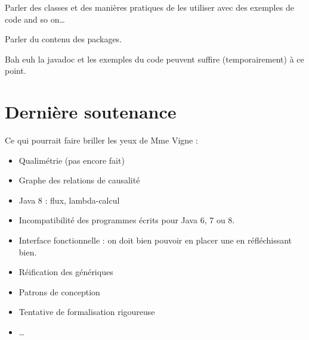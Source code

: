 \documentclass[11pt]{article}
\begin{document}
Parler des classes et des manières \og pratiques \fg{} de les utiliser avec des exemples de code and so on\dots

Parler du contenu des packages.

Bah euh la javadoc et les exemples du code peuvent suffire (temporairement) à ce point.

\section{Dernière soutenance}

Ce qui pourrait faire briller les yeux de Mme Vigne :
\begin{itemize}
\item Qualimétrie (pas encore fait)
\item Graphe des relations de causalité
\item Java 8 : flux, lambda-calcul
\item Incompatibilité des programmes écrits pour Java 6, 7 ou 8.
\item Interface fonctionnelle : on doit bien pouvoir en placer une en réfléchissant bien.
\item Réification des génériques
\item Patrons de conception
\item Tentative de formalisation rigoureuse
\item \dots
\end{itemize}
\end{document}
